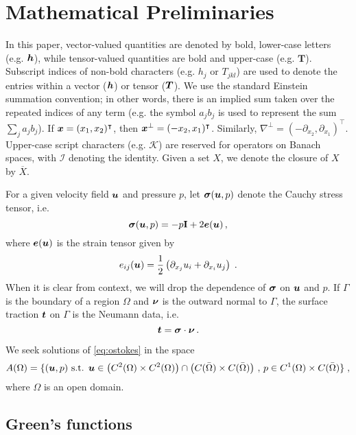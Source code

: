 \section{Mathematical Preliminaries}
\label{sec:prelim}
In this paper, vector-valued
quantities are denoted by bold, lower-case letters
(e.g. ${\boldsymbol h}$), while tensor-valued quantities are bold
and upper-case (e.g. $\mathbf{T}$). 
Subscript indices of non-bold characters (e.g. $h_j$ or $T_{jkl}$)
are used to denote the entries within a vector (${\boldsymbol h}$) or tensor (${\boldsymbol T}$).
We use the standard Einstein summation convention; in other words, 
there is an implied sum taken over the repeated indices of 
any term (e.g. the symbol $a_{j} b_{j}$ is used to represent the sum
$\sum_{j} a_{j} b_{j}$).
If ${\boldsymbol x} = (x_1,x_2)^\intercal$, then ${\boldsymbol x}^\bot = (-x_2,x_1)^\intercal$.
Similarly, $\nabla^\bot = (-\partial_{x_2},\partial_{x_1})^\intercal$.
Upper-case script characters (e.g. $\mathcal{K}$) are reserved for
operators on Banach spaces, with $\mathcal{I}$ denoting the
identity. Given a set $X$, we denote the closure of $X$
by $\overline{X}$.

For a given velocity field ${\boldsymbol u}$ and pressure $p$, let ${\boldsymbol \sigma}({\boldsymbol u},p)$
denote the Cauchy stress tensor, i.e.
\begin{equation}
{\boldsymbol \sigma}({\boldsymbol u},p) = -p {\bf I} + 2 {\boldsymbol e}({\boldsymbol u}) \, ,
\end{equation}
where ${\boldsymbol e}({\boldsymbol u})$ is the strain tensor given by
\begin{equation}
e_{ij}({\boldsymbol u}) = \frac{1}{2} \left( \partial_{x_j} u_i + \partial_{x_i} u_j \right) \; .
\end{equation}
When it is clear from context, we will drop the dependence of
${\boldsymbol \sigma}$ on ${\boldsymbol u}$ and $p$.
If $\Gamma$ is the boundary of a region $\Omega$ and ${\boldsymbol \nu}$ is the outward
normal to $\Gamma$, the surface traction ${\boldsymbol t}$ on $\Gamma$ 
is the Neumann data, i.e. 
\begin{equation}
{\boldsymbol t} = {\boldsymbol \sigma} \cdot {\boldsymbol \nu} \, .
\end{equation}

We seek solutions of \cref{eq:ostokes} in the space
\begin{equation}
  A(\Omega) = \{ ({\boldsymbol u},p) \textrm{ s.t. } {\boldsymbol u} \in
  \left ( C^2(\Omega)\times C^2(\Omega) \right ) \cap
  \left ( C(\bar{\Omega}) \times C(\bar{\Omega}) \right ) \, , \,
  p \in C^1(\Omega) \times C(\bar{\Omega})\} \; ,
\end{equation}
where $\Omega$ is an open domain.

\subsection{Green's functions}

